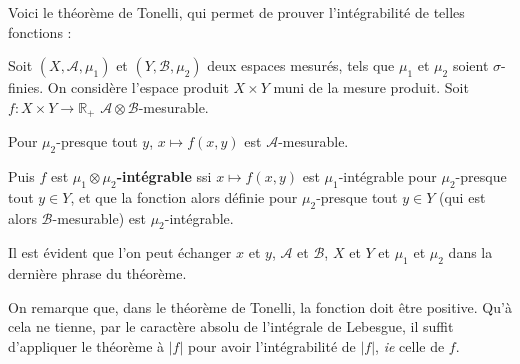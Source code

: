 \documentclass[../integ-proba.tex]{subfiles}
\begin{document}
  Voici le théorème de Tonelli, qui permet de prouver l'intégrabilité de telles fonctions :

  \begin{thm}
    \label{thm:tonelli}
    Soit $\left(X, \mathcal{A}, \mu_1\right)$ et $\left(Y, \mathcal{B}, \mu_2\right)$ deux espaces mesurés, tels que $\mu_1$ et $\mu_2$ soient $\sigma$-finies.
    On considère l'espace produit $X \times Y$ muni de la mesure produit.
    Soit $f:X \times Y \rightarrow \mathbb{R}_+$ $\mathcal{A} \otimes \mathcal{B}$-mesurable.

    Pour $\mu_2$-presque tout $y$, $x \mapsto f(x,y)$ est $\mathcal{A}$-mesurable.

    Puis $f$ est $\mu_1 \otimes \mu_2$\textbf{-intégrable} ssi $x \mapsto f(x,y)$ est $\mu_1$-intégrable pour $\mu_2$-presque tout $y \in Y$,
    et que la fonction alors définie pour $\mu_2$-presque tout $y \in Y$ (qui est alors $\mathcal{B}$-mesurable) est $\mu_2$-intégrable.
  \end{thm}

  \begin{rem}
    Il est évident que l'on peut échanger $x$ et $y$, $\mathcal{A}$ et $\mathcal{B}$, $X$ et $Y$ et $\mu_1$ et $\mu_2$ dans la dernière phrase du théorème.
  \end{rem}

  \begin{rem}
    On remarque que, dans le théorème de Tonelli, la fonction doit être positive.
    Qu'à cela ne tienne, par le caractère absolu de l'intégrale de Lebesgue, il suffit d'appliquer le théorème à $\left|f\right|$ pour avoir l'intégrabilité de $\left|f\right|$, \textit{ie} celle de $f$.
  \end{rem}
\end{document}

